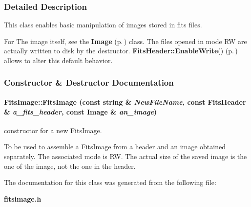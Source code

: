 \subsubsection{Detailed Description}
This class enables basic manipulation of images stored in fits files.

For The image itself, see the {\bf Image} {\rm (p.\,\pageref{class_image})} class. The files opened in mode RW are actually written to disk by the destructor. {\bf Fits\-Header::Enable\-Write}() {\rm (p.\,\pageref{class_fitsheader_a45})} allows to alter this default behavior. 



\subsubsection{Constructor \& Destructor Documentation}
\paragraph{\setlength{\rightskip}{0pt plus 5cm}Fits\-Image::Fits\-Image (const string \& {\em New\-File\-Name}, const {\bf Fits\-Header} \& {\em a\_\-fits\_\-header}, const {\bf Image} \& {\em an\_\-image})}\hfill\label{class_fitsimage_a2}


constructor for a new Fits\-Image.

To be used to assemble a Fits\-Image from a header and an image obtained separately. The associated mode is RW. The actual size of the saved image is the one of the image, not the one in the header. 

The documentation for this class was generated from the following file:\begin{CompactItemize}
\item 
{\bf fitsimage.h}\end{CompactItemize}
